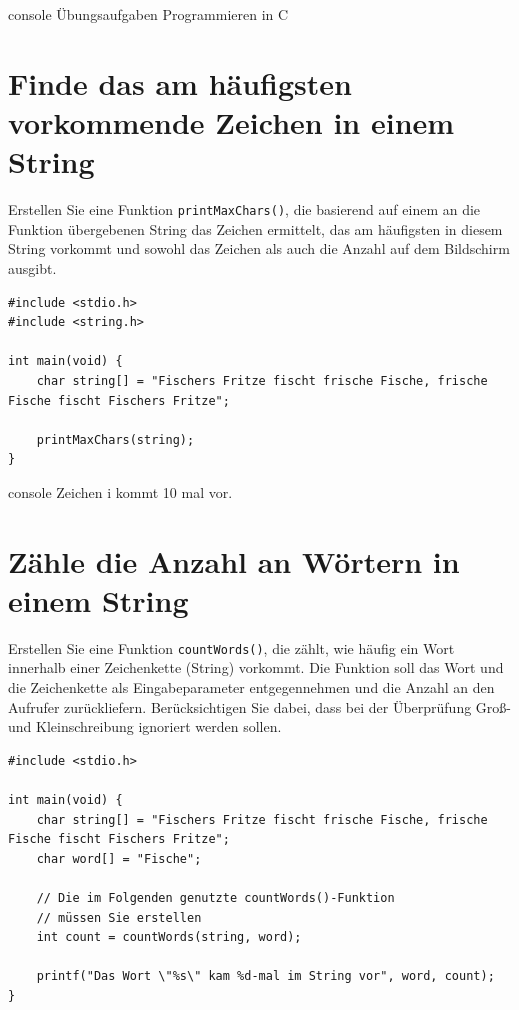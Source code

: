 \begin{mybox}[Bildschirmausgabe]{console}
Übungsaufgaben Programmieren in C
\end{mybox}





\chapter{Finde das am häufigsten vorkommende Zeichen in einem String}

\vspace{10pt}

Erstellen Sie eine Funktion \texttt{printMaxChars()}, die basierend auf
einem an die Funktion übergebenen String das Zeichen ermittelt, das am
häufigsten in diesem String vorkommt und sowohl das Zeichen als auch die Anzahl
auf dem Bildschirm ausgibt.

\Vorlage
\begin{verbatim}
#include <stdio.h>
#include <string.h>

int main(void) {
    char string[] = "Fischers Fritze fischt frische Fische, frische Fische fischt Fischers Fritze";

    printMaxChars(string);
}
\end{verbatim}

\begin{mybox}[Bildschirmausgabe]{console}
Zeichen i kommt 10 mal vor.
\end{mybox}




\chapter{Zähle die Anzahl an Wörtern in einem String}

\vspace{10pt}

Erstellen Sie eine Funktion \texttt{countWords()}, die zählt, wie häufig
ein Wort innerhalb einer Zeichenkette (String) vorkommt. Die Funktion soll das
Wort und die Zeichenkette als Eingabeparameter entgegennehmen und die Anzahl an
den Aufrufer zurückliefern. Berücksichtigen Sie dabei, dass bei der Überprüfung
Groß- und Kleinschreibung ignoriert werden sollen.

\Vorlage
\begin{verbatim}
#include <stdio.h>

int main(void) {
    char string[] = "Fischers Fritze fischt frische Fische, frische Fische fischt Fischers Fritze";
    char word[] = "Fische";

    // Die im Folgenden genutzte countWords()-Funktion
    // müssen Sie erstellen
    int count = countWords(string, word);

    printf("Das Wort \"%s\" kam %d-mal im String vor", word, count);
}
\end{verbatim}

